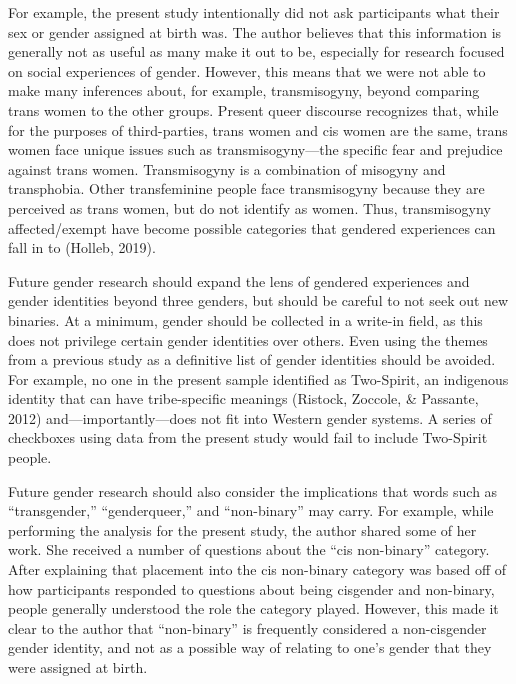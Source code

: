 \documentclass[12pt,twoside]{reedthesis}
\begin{document}
For example, the present study intentionally did not ask participants what their sex or gender assigned at birth was. The author believes that this information is generally not as useful as many make it out to be, especially for research focused on social experiences of gender. However, this means that we were not able to make many inferences about, for example, transmisogyny, beyond comparing trans women to the other groups. Present queer discourse recognizes that, while for the purposes of third-parties, trans women and cis women are the same, trans women face unique issues such as transmisogyny---the specific fear and prejudice against trans women. Transmisogyny is a combination of misogyny and transphobia. Other transfeminine people face transmisogyny because they are perceived as trans women, but do not identify as women. Thus, transmisogyny affected/exempt have become possible categories that gendered experiences can fall in to (Holleb, 2019).

Future gender research should expand the lens of gendered experiences and gender identities beyond three genders, but should be careful to not seek out new binaries. At a minimum, gender should be collected in a write-in field, as this does not privilege certain gender identities over others. Even using the themes from a previous study as a definitive list of gender identities should be avoided. For example, no one in the present sample identified as Two-Spirit, an indigenous identity that can have tribe-specific meanings (Ristock, Zoccole, \& Passante, 2012) and---importantly---does not fit into Western gender systems. A series of checkboxes using data from the present study would fail to include Two-Spirit people.

Future gender research should also consider the implications that words such as ``transgender,'' ``genderqueer,'' and ``non-binary'' may carry. For example, while performing the analysis for the present study, the author shared some of her work. She received a number of questions about the ``cis non-binary'' category. After explaining that placement into the cis non-binary category was based off of how participants responded to questions about being cisgender and non-binary, people generally understood the role the category played. However, this made it clear to the author that ``non-binary'' is frequently considered a non-cisgender gender identity, and not as a possible way of relating to one's gender that they were assigned at birth.
\end{document}
